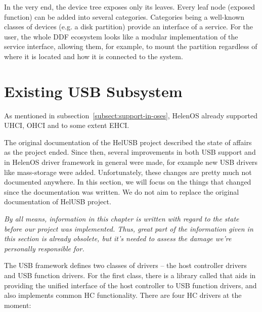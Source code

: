 In the very end, the device tree exposes only its leaves. Every leaf node
(exposed function) can be added into several categories. Categories being
a well-known classes of devices (e.g. a disk partition) provide an interface
of a service. For the user, the whole DDF ecosystem looks like a modular
implementation of the service interface, allowing them, for example, to mount
the partition regardless of where it is located and how it is connected to the
system.



\section{Existing USB Subsystem}

As mentioned in subsection~\ref{subsect:support-in-oses}, HelenOS already supported
UHCI, OHCI and to some extent EHCI.

The original documentation of the HelUSB project described the state of affairs
as the project ended. Since then, several improvements in both USB support
and in HelenOS driver framework in general were made, for example new USB
drivers like mass-storage were added. Unfortunately, these changes are pretty
much not documented anywhere. In this section, we will focus on the things that changed since the
documentation was written. We do not aim to replace the original documentation
of HelUSB project.

\vspace{1.5em}
\textsl{By all means, information in this chapter is written with
regard to the state before \emph{our} project was implemented. Thus, great part
of the information given in this section is already obsolete, but it's needed to
assess the damage we're personally responsible for.}
\vspace{1.5em}

The USB framework defines two classes of drivers -- the host controller drivers
and USB function drivers. For the first class, there is a library called
 that aids in providing the unified interface of the host
controller to USB function drivers, and also implements common HC
functionality. There are four HC drivers at the moment:

